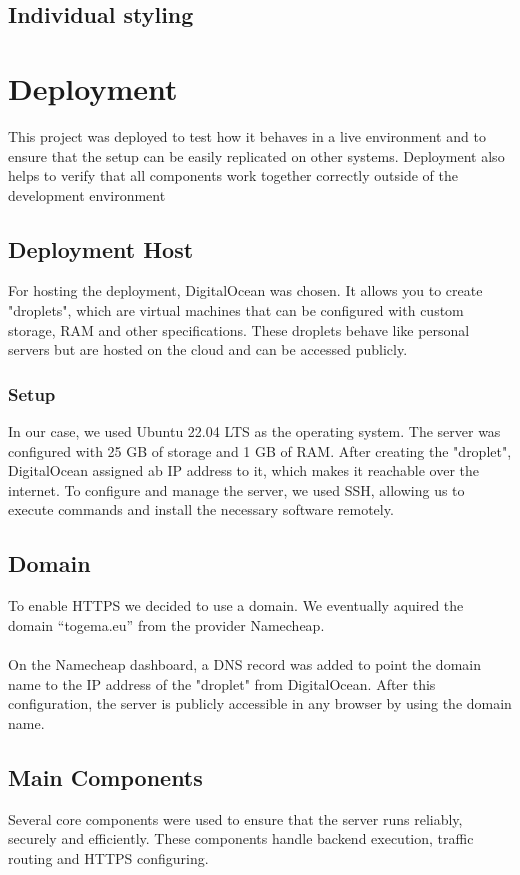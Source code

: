\documentclass[a4paper,12pt]{report}
\begin{document}
\subsection{Individual styling}

\section{Deployment}
This project was deployed to test how it behaves in a live environment and to ensure that the setup can be easily replicated on other systems. Deployment also helps to verify that all components work together correctly outside of the development environment 
\subsection{Deployment Host}
For hosting the deployment, DigitalOcean was chosen. It allows you to create "droplets", which are virtual machines that can be configured with custom storage, RAM and other specifications. These droplets behave like personal servers but are hosted on the cloud and can be accessed publicly.
\subsubsection{Setup}
In our case, we used Ubuntu 22.04 LTS as the operating system. The server was configured with 25 GB of storage and 1 GB of RAM. After creating the "droplet", DigitalOcean assigned ab IP address to it, which makes it reachable over the internet. To configure and manage the server, we used SSH, allowing us to execute commands and install the necessary software remotely.
\subsection{Domain}
To enable HTTPS we decided to use a domain. We eventually aquired the domain “togema.eu” from the provider Namecheap.\\\\
On the Namecheap dashboard, a DNS record was added to point the domain name to the IP address of the "droplet" from DigitalOcean. After this configuration, the server is publicly accessible in any browser by using the domain name.
\subsection{Main Components}
Several core components were used to ensure that the server runs reliably, securely and efficiently. These components handle backend execution, traffic routing and HTTPS configuring.
\end{document}
